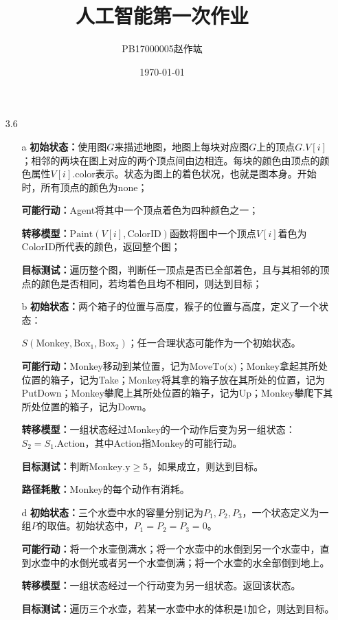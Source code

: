 \documentclass[UTF8,zihao=-4]{ctexart}
\title{\heiti 人工智能\quad 第一次作业}
\author{\CJKfamily{namekai} PB17000005\quad 赵作竑}
\date{\kaishu \today}
\begin{document}
	\maketitle
	\begin{itemize}
		\item[3.6]
		\begin{itemize}
			\item[a]
			\textbf{初始状态：}使用图$G$来描述地图，地图上每块对应图$G$上的顶点$G.V[i]$；相邻的两块在图上对应的两个顶点间由边相连。每块的颜色由顶点的颜色属性$V[i].\text{color}$表示。状态为图上的着色状况，也就是图本身。开始时，所有顶点的颜色为none；

			\textbf{可能行动：}Agent将其中一个顶点着色为四种颜色之一；
			
			\textbf{转移模型：}$\text{Paint}(V[i],\text{ColorID})$函数将图中一个顶点$V[i]$着色为ColorID所代表的颜色，返回整个图；

			\textbf{目标测试：}遍历整个图，判断任一顶点是否已全部着色，且与其相邻的顶点的颜色是否相同，若均着色且均不相同，则达到目标；
			\item[b]
			\textbf{初始状态：}两个箱子的位置与高度，猴子的位置与高度，定义了一个状态：
			
			$S(\text{Monkey},\text{Box}_1,\text{Box}_2)$；任一合理状态可能作为一个初始状态。

			\textbf{可能行动：}Monkey移动到某位置，记为$\text{MoveTo(x)}$；Monkey拿起其所处位置的箱子，记为Take；Monkey将其拿的箱子放在其所处的位置，记为PutDown；Monkey攀爬上其所处位置的箱子，记为Up；Monkey攀爬下其所处位置的箱子，记为Down。
			
			\textbf{转移模型：}一组状态经过Monkey的一个动作后变为另一组状态：$S_2=S_1.\text{Action}$，其中Action指Monkey的可能行动。

			\textbf{目标测试：}判断$\text{Monkey}.\text{y} \geq 5$，如果成立，则达到目标。

			\textbf{路径耗散：}Monkey的每个动作有消耗。
			\item[d]
			\textbf{初始状态：}三个水壶中水的容量分别记为$P_1,P_2,P_3$，一个状态定义为一组$P$的取值。初始状态中，$P_1=P_2=P_3=0$。

			\textbf{可能行动：}将一个水壶倒满水；将一个水壶中的水倒到另一个水壶中，直到水壶中的水倒光或者另一个水壶倒满；将一个水壶的水全部倒到地上。
			
			\textbf{转移模型：}一组状态经过一个行动变为另一组状态。返回该状态。

			\textbf{目标测试：}遍历三个水壶，若某一水壶中水的体积是1加仑，则达到目标。


\end{itemize}
\end{itemize}
\end{document}
